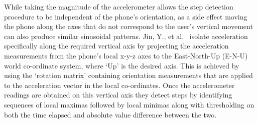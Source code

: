 \documentclass[12pt,a4paper,notitlepage]{report}
\begin{document}
While taking the magnitude of the accelerometer allows the step detection procedure to be independent of the phone’s orientation, as a side effect moving the phone along the axes that do not correspond to the user’s vertical movement can also produce similar sinusoidal patterns. Jin, Y., et al.~\cite{jin2011robust} isolate acceleration specifically along the required vertical axis by projecting the acceleration measurements from the phone’s local x-y-z axes to the East-North-Up (E-N-U) world co-ordinate system, where `Up' is the desired axis.  This is achieved by using the `rotation matrix' containing orientation measurements that are applied to the acceleration vector in the local co-ordinates. Once the accelerometer readings are obtained on this vertical axis they detect steps by identifying sequences of local maximas followed by local minimas along with thresholding on both the time elapsed and absolute value difference between the two. 
\end{document}

